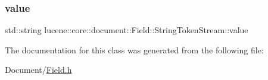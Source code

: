 \subsubsection{\texorpdfstring{value}{value}}
{\footnotesize\ttfamily std\+::string lucene\+::core\+::document\+::\+Field\+::\+String\+Token\+Stream\+::value\hspace{0.3cm}{\ttfamily [private]}}



The documentation for this class was generated from the following file\+:\begin{DoxyCompactItemize}
\item 
Document/\mbox{\hyperlink{Document_2Field_8h}{Field.\+h}}\end{DoxyCompactItemize}
